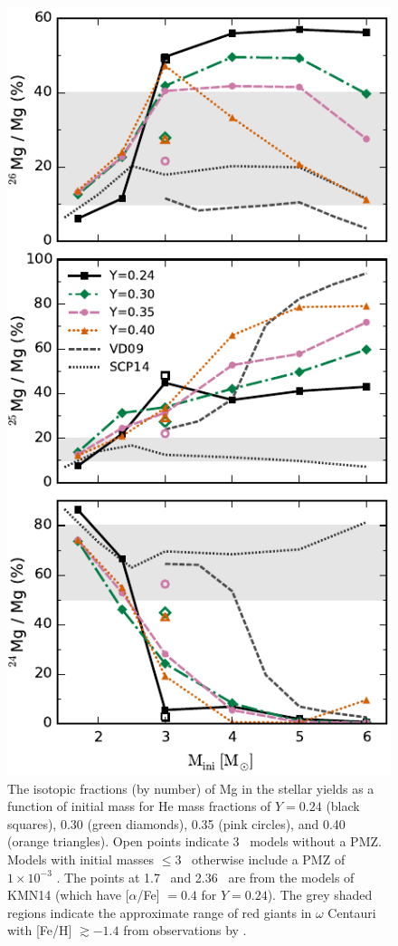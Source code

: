 \begin{figure}
 \begin{center}\includegraphics[height=0.82\textheight]{fig-yieldsmgisotopes.pdf}\end{center}
 \caption{The isotopic fractions (by number) of Mg in the stellar yields as a function of initial mass for He mass fractions of $Y= 0.24$ (black squares), 0.30 (green diamonds), 0.35 (pink circles), and 0.40 (orange triangles). Open points indicate 3 \Msun\ models without a PMZ. Models with initial masses $\leq 3$ \Msun\ otherwise include a PMZ of $1\times10^{-3}$ \Msun. The points at 1.7 \Msun\ and 2.36 \Msun\ are from the models of KMN14 (which have [$\alpha$/Fe] $=0.4$ for $Y=0.24$). The grey shaded regions indicate the approximate range of red giants in $\omega$ Centauri with [Fe/H] $\gtrsim -1.4$ from observations by \citet{DaCosta:2013cf}.}\label{fig:mgisotopes}
\end{figure}

